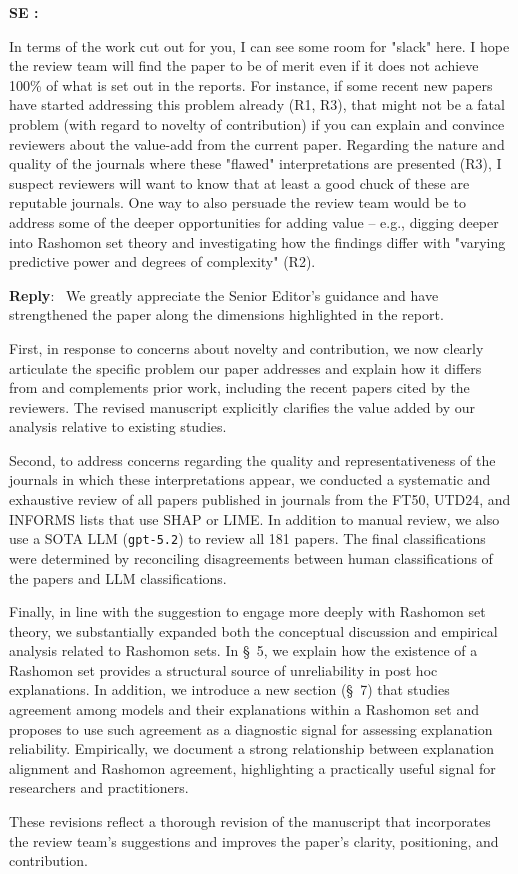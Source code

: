 \documentclass[11pt]{article}
\newcounter{se}[section]
\newenvironment{se}[1][]{%
    \refstepcounter{se}\par\medskip\noindent%
    \textbf{SE \these: #1}\rmfamily\itshape%
}{\medskip}
\newcounter{reviewer}
\newenvironment{reply}
 {\par\medskip \noindent \begin{sf}\textbf{Reply}:\ }
 {\medskip \end{sf}}
\begin{document}
\begin{se}
In terms of the work cut out for you, I can see some room for "slack" here. I hope the review team will find the paper to be of merit even if it does not achieve 100\% of what is set out in the reports. For instance, if some recent new papers have started addressing this problem already (R1, R3), that might not be a fatal problem (with regard to novelty of contribution) if you can explain and convince reviewers about the value-add from the current paper. Regarding the nature and quality of the journals where these "flawed" interpretations are presented (R3), I suspect reviewers will want to know that at least a good chuck of these are reputable journals. One way to also persuade the review team would be to address some of the deeper opportunities for adding value -- e.g., digging deeper into Rashomon set theory and investigating how the findings differ with "varying predictive power and degrees of complexity" (R2).

\end{se}

\begin{reply}
We greatly appreciate the Senior Editor’s guidance and have strengthened the paper along the dimensions highlighted in the report.

First, in response to concerns about novelty and contribution, we now clearly articulate the specific problem our paper addresses and explain how it differs from and complements prior work, including the recent papers cited by the reviewers. The revised manuscript explicitly clarifies the value added by our analysis relative to existing studies.

Second, to address concerns regarding the quality and representativeness of the journals in which these interpretations appear, we conducted a systematic and exhaustive review of all papers published in journals from the FT50, UTD24, and INFORMS lists that use SHAP or LIME. In addition to manual review, we also use a SOTA LLM (\texttt{gpt-5.2}) to review all 181 papers. The final classifications were determined by reconciling disagreements between human classifications of the papers and LLM classifications. 

Finally, in line with the suggestion to engage more deeply with Rashomon set theory, we substantially expanded both the conceptual discussion and empirical analysis related to Rashomon sets. In \S~5, we explain how the existence of a Rashomon set provides a structural source of unreliability in post hoc explanations. In addition, we introduce a new section (\S~7) that studies agreement among models and their explanations within a Rashomon set and proposes to use such agreement as a diagnostic signal for assessing explanation reliability. Empirically, we document a strong relationship between explanation alignment and Rashomon agreement, highlighting a practically useful signal for researchers and practitioners.

These revisions reflect a thorough revision of the manuscript that incorporates the review team’s suggestions and improves the paper’s clarity, positioning, and contribution.
\end{reply}
\end{document}
